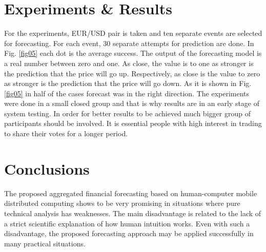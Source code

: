 \documentclass[runningheads]{llncs}
\begin{document}
\section{Experiments \& Results}
%
For the experiments, EUR/USD pair is taken and ten separate events are selected for forecasting. For each event, 30 separate attempts for prediction are done. In Fig. \ref{fig05} each dot is the average success. The output of the forecasting model is a real number between zero and one. As close, the value is to one as stronger is the prediction that the price will go up. Respectively, as close is the value to zero as stronger is the prediction that the price will go down. As it is shown in Fig. \ref{fig05} in half of the cases forecast was in the right direction. The experiments were done in a small closed group and that is why results are in an early stage of system testing. In order for better results to be achieved much bigger group of participants should be involved. It is essential people with high interest in trading to share their votes for a longer period. 
%
\section{Conclusions}
%
The proposed aggregated financial forecasting based on human-computer mobile distributed computing shows to be very promising in situations where pure technical analysis has weaknesses. The main disadvantage is related to the lack of a strict scientific explanation of how human intuition works. Even with such a disadvantage, the proposed forecasting approach may be applied successfully in many practical situations. 
\end{document}
